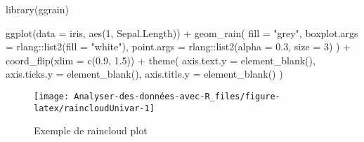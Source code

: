 \documentclass[
]{book}
\newenvironment{Shaded}{\begin{snugshade}}{\end{snugshade}}
\newcommand{\AttributeTok}[1]{\textcolor[rgb]{0.77,0.63,0.00}{#1}}
\newcommand{\DecValTok}[1]{\textcolor[rgb]{0.00,0.00,0.81}{#1}}
\newcommand{\FloatTok}[1]{\textcolor[rgb]{0.00,0.00,0.81}{#1}}
\newcommand{\FunctionTok}[1]{\textcolor[rgb]{0.00,0.00,0.00}{#1}}
\newcommand{\NormalTok}[1]{#1}
\newcommand{\SpecialCharTok}[1]{\textcolor[rgb]{0.00,0.00,0.00}{#1}}
\newcommand{\StringTok}[1]{\textcolor[rgb]{0.31,0.60,0.02}{#1}}
\begin{document}
\begin{Shaded}
\begin{Highlighting}[]
\FunctionTok{library}\NormalTok{(ggrain)}

\FunctionTok{ggplot}\NormalTok{(}\AttributeTok{data =}\NormalTok{ iris, }\FunctionTok{aes}\NormalTok{(}\DecValTok{1}\NormalTok{, Sepal.Length)) }\SpecialCharTok{+}
  \FunctionTok{geom\_rain}\NormalTok{(}
    \AttributeTok{fill =} \StringTok{"grey"}\NormalTok{,}
    \AttributeTok{boxplot.args =}\NormalTok{  rlang}\SpecialCharTok{::}\FunctionTok{list2}\NormalTok{(}\AttributeTok{fill =} \StringTok{"white"}\NormalTok{),}
    \AttributeTok{point.args =}\NormalTok{ rlang}\SpecialCharTok{::}\FunctionTok{list2}\NormalTok{(}\AttributeTok{alpha =} \FloatTok{0.3}\NormalTok{, }\AttributeTok{size =} \DecValTok{3}\NormalTok{)}
\NormalTok{  ) }\SpecialCharTok{+}
  \FunctionTok{coord\_flip}\NormalTok{(}\AttributeTok{xlim =} \FunctionTok{c}\NormalTok{(}\FloatTok{0.9}\NormalTok{, }\FloatTok{1.5}\NormalTok{)) }\SpecialCharTok{+}
  \FunctionTok{theme}\NormalTok{(}
    \AttributeTok{axis.text.y =} \FunctionTok{element\_blank}\NormalTok{(),}
    \AttributeTok{axis.ticks.y =} \FunctionTok{element\_blank}\NormalTok{(),}
    \AttributeTok{axis.title.y =} \FunctionTok{element\_blank}\NormalTok{()}
\NormalTok{  )}
\end{Highlighting}
\end{Shaded}

\begin{figure}

{\centering \texttt{[image: Analyser-des-données-avec-R\_files/figure-latex/raincloudUnivar-1]} 

}

\caption{Exemple de raincloud plot}\label{fig:raincloudUnivar}
\end{figure}
\end{document}
